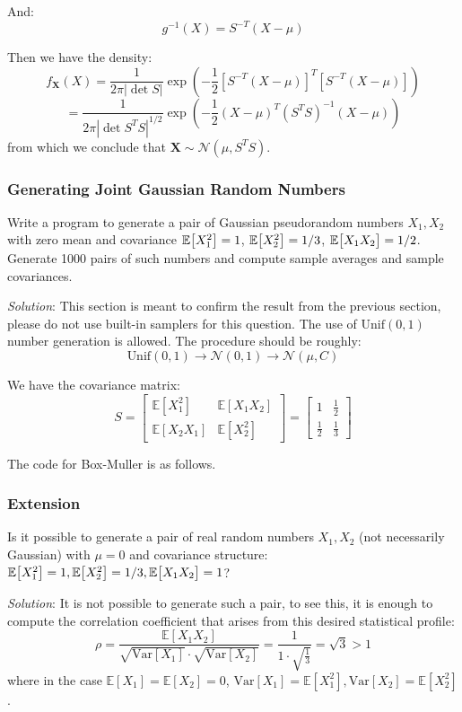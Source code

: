 \documentclass{article}
\begin{document}
And: 
$$
    g^{-1}(X) = S^{-T}(X - \mu)
$$

Then we have the density:
$$
    f_{\mathbf{X}}(X) = \frac{1}{2\pi|\det S|}\exp(-\frac12[S^{-T}(X-\mu)]^T[S^{-T}(X-\mu)])
$$
$$
    = \frac{1}{2\pi |\det S^TS|^{1/2}}\exp(-\frac{1}{2}(X-\mu)^T(S^TS)^{-1}(X-\mu))
$$ from which we conclude that $\mathbf{X}\sim \mathcal{N}(\mu, S^TS)$.




\subsubsection{Generating Joint Gaussian Random Numbers} Write a program to generate a pair of Gaussian pseudorandom numbers $X_1, X_2$ with zero mean and covariance $\mathbb{E}\big[ {X_1^2} \big] = 1$, $\mathbb{E}\big[ {X_2^2} \big]= 1/3$, $\mathbb{E}\big[ {X_1X_2} \big] = 1/2$. Generate 1000 pairs of such numbers and compute sample averages and sample covariances.

\emph{Solution}: This section is meant to confirm the result from the previous section, please do not use built-in samplers for this question. The use of $\text{Unif}(0,1)$ number generation is allowed. The procedure should be roughly:
$$
    \text{Unif}(0,1) \rightarrow \mathcal{N}(0,1) \rightarrow \mathcal{N}({\mu, C})
$$

We have the covariance matrix:
$$
    S = 
    \begin{bmatrix}
        \mathbb{E}[X_1^2] & \mathbb{E}[X_1X_2]\\
        \mathbb{E}[X_2X_1] & \mathbb{E}[X_2^2]
    \end{bmatrix} = 
    \begin{bmatrix}
        1 & \frac12\\
        \frac12 & \frac13
    \end{bmatrix}
$$

The code for Box-Muller is as follows.





\subsubsection{Extension} Is it possible to generate a pair of real random numbers $X_1,X_2$ (not necessarily Gaussian) with $\mu = 0$ and covariance structure: $\mathbb{E}\big[ {X_1^2} \big] = 1, \mathbb{E}\big[ {X_2^2} \big] = 1/3, \mathbb{E}\big[ {X_1X_2} \big] = 1$?

\emph{Solution}: It is not possible to generate such a pair, to see this, it is enough to compute the correlation coefficient that arises from this desired statistical profile:
$$
    \rho = \frac{\mathbb{E}[X_1X_2]}{\sqrt{\text{Var}[X_1]}\cdot\sqrt{\text{Var}[X_2]}} = \frac{1}{1\cdot \sqrt{\frac13}} = \sqrt{3} > 1
$$ where in the case $\mathbb{E}[X_1] = \mathbb{E}[X_2] = 0$, $\text{Var}[X_1] = \mathbb{E}[X_1^2], \text{Var}[X_2] = \mathbb{E}[X_2^2]$.
\end{document}
